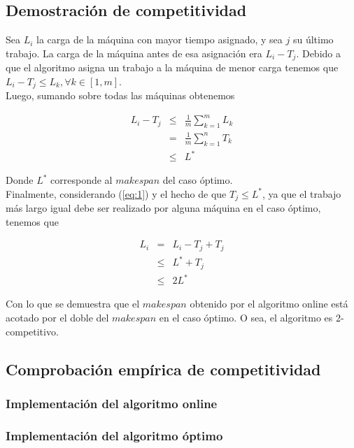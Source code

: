 \documentclass[12pt,letterpaper]{article}
\begin{document}
\subsection{Demostración de competitividad}
	Sea $L_{i}$ la carga de la máquina con mayor tiempo asignado, y sea $j$ su último trabajo. La carga de la máquina antes de esa asignación era $L_{i} - T_{j}$. Debido a que el algoritmo asigna un trabajo a la máquina de menor carga tenemos que $L_{i} - T_{j} \leq L_{k}, \forall k \in [1, m]$. \\
	
	Luego, sumando sobre todas las máquinas obtenemos
	
\begin{eqnarray}
L_{i} - T_{j}	&\leq& 		\frac{1}{m} \sum_{k=1}^{m} L_{k}	\nonumber \\
				&=& 		\frac{1}{m} \sum_{k=1}^{n} T_{k}  	\nonumber \\
				&\leq& 		L^{*} \label{eq:1}
\end{eqnarray}

Donde $L^{*}$ corresponde al $makespan$ del caso óptimo.\\

Finalmente, considerando (\ref{eq:1}) y el hecho de que $T_{j} \leq L^{*}$, ya que el trabajo más largo igual debe ser realizado por alguna máquina en el caso óptimo, tenemos que 

\begin{eqnarray}
L_{i}		&=&		L_{i} - T_{j} + T_{j}	\nonumber \\
			&\leq&	L^{*} + T_{j} 			\nonumber \\
			&\leq& 2 L^{*}
\end{eqnarray}

Con lo que se demuestra que el $makespan$ obtenido por el algoritmo online está acotado por el doble del $makespan$ en el caso óptimo. O sea, el algoritmo es 2-competitivo.

\subsection{Comprobación empírica de competitividad}
\subsubsection{Implementación del algoritmo online}
\subsubsection{Implementación del algoritmo óptimo}
\end{document}
